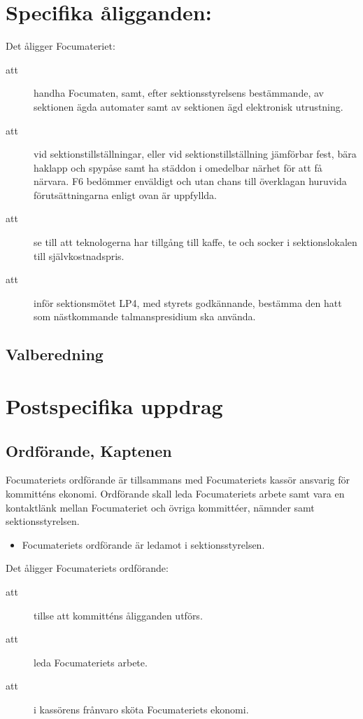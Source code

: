 \documentclass[a4paper]{article}
\begin{document}
\begin{foreningenv}{\forening{}}
    \section{Specifika åligganden:}
    Det åligger Focumateriet:
    \begin{description}
        \item[att] handha Focumaten, samt, efter sektionsstyrelsens bestämmande, av sektionen ägda automater samt av sektionen ägd elektronisk utrustning.
        \item[att] vid sektionstillställningar, eller vid sektionstillställning jämförbar fest, bära haklapp och spypåse samt ha städdon i omedelbar närhet för att få närvara. F6 bedömmer enväldigt och utan chans till överklagan huruvida förutsättningarna enligt ovan är uppfyllda.
        \item[att] se till att teknologerna har tillgång till kaffe, te och socker i sektionslokalen till självkostnadspris.
        \item[att] inför sektionsmötet LP4, med styrets godkännande, bestämma den hatt som nästkommande talmanspresidium ska använda.
    \end{description}
    
    \subsection{Valberedning}
    \aliggvalber{}
    
    \section{Postspecifika uppdrag}
    \subsection{Ordförande, Kaptenen}
    Focumateriets ordförande är tillsammans med Focumateriets kassör ansvarig för kommitténs ekonomi. Ordförande skall leda Focumateriets arbete samt vara en kontaktlänk mellan Focumateriet och övriga kommittéer, nämnder samt sektionsstyrelsen. 
    
    \begin{itemize}
        \item Focumateriets ordförande är ledamot i sektionsstyrelsen.
    \end{itemize}
    
    Det åligger Focumateriets ordförande:
    \begin{description}
        \item[att] tillse att kommitténs åligganden utförs.
        \item[att] leda Focumateriets arbete. 
        \item[att] i kassörens frånvaro sköta Focumateriets ekonomi. 
    \end{description}
    

\end{foreningenv}
\end{document}
